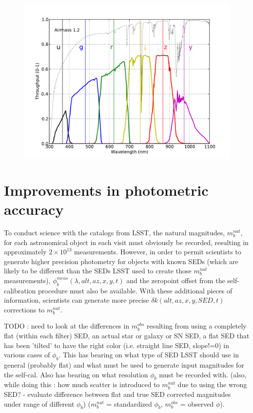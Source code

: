 \documentclass[12pt,preprint]{aastex}
\begin{document}
\begin{figure}[ht]
\includegraphics[width=5in]{filters}
\end{figure}


\section{Improvements in photometric accuracy}
\label{sec:photo_better}

To conduct science with the catalogs from LSST, the natural magnitudes, $m_b^{nat}$, for each astronomical object in
each visit must obviously be recorded, resulting in approximately
$2\times10^{13}$ measurements. However, in order to permit scientists
to generate higher precision photometry for objects with known SEDs
(which are likely to be different than the SEDs LSST used to create
those $m_b^{nat}$ measurements),
$\phi_b^{meas}(\lambda,alt,az,x,y,t)$ and the zeropoint offset from
the self-calibration procedure must also be available. With these
additional pieces of information, scientists can generate more precise
$\delta k(alt,az,x,y,SED,t)$ corrections to $m_b^{nat}$.

TODO : need to look at the differences in $m_b^{obs}$ resulting from
using a completely flat (within each filter) SED, an actual star or
galaxy or SN SED, a flat SED that has been 'tilted' to have the right
color (i.e. straight line SED, slope!=0) in various cases of
$\phi_b$. This has bearing on what type of SED LSST should use in
general (probably flat) and what must be used to generate input
magnitudes for the self-cal. Also has bearing on what resolution
$\phi_b$ must be recorded with.   (also, while doing this : how much
scatter is introduced to $m_b^{nat}$ due to using the wrong SED? -
evaluate difference between flat and true SED corrected magnitudes under range of different
$\phi_b$)  ($m_b^{nat}$ = standardized $\phi_b$, $m_b^{obs}$ =
observed $\phi$). 
\end{document}

